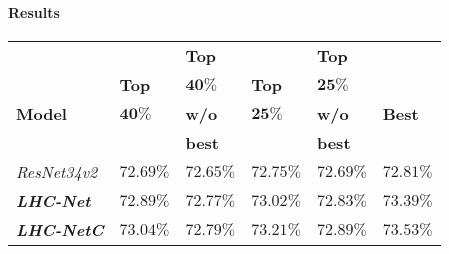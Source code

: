 \documentclass[fleqn,10pt]{SelfArx}
\begin{document}
\paragraph{Results}
\begin{center}
\begin{tabular}{||p{1.58cm} | p{0.85cm} | p{0.85cm} | p{0.85cm} | p{0.85cm} | p{0.85cm}||}  
 \hline
                      &                                                & \hspace{0.15cm}\textbf{Top}         &                                                    &\hspace{0.08cm} \textbf{Top}                             &  \\ 
                      &\hspace{0.1cm} \textbf{Top}        & \hspace{0.15cm}$\mathbf{40 \%}$ & \hspace{0.15cm}\textbf{Top}           &\hspace{0.08cm} $\mathbf{25 \%}$                    &\\
\hspace{0.35cm}\textbf{Model}                      &\hspace{0.1cm} $\mathbf{40 \%}$ & \hspace{0.15cm}\textbf{w/o}         & \hspace{0.15cm}$\mathbf{25 \%}$   &\hspace{0.08cm} \textbf{w/o}                            & \hspace{0.03cm} \textbf{Best}\\
                      &                                                & \hspace{0.15cm}\textbf{best}         &                                                    &\hspace{0.14cm}\textbf{best}                            &\\
 \hline
 \hline
\textit{ResNet34v2} & $72.69\%$ & $72.65\%$ & $72.75\%$ & $72.69\%$ & $72.81\%$\\
 \hline
 \hline
\textbf{\textit{LHC-Net}} & $\mathbf{72.89\%}$ & $72.77\%$ & $\mathbf{73.02\%}$ & $72.83\%$ & $\mathbf{73.39\%}$\\
 \hline
 \hline
\textbf{\textit{LHC-NetC}} & $\mathbf{73.04\%}$ & $72.79\%$ & $\mathbf{73.21\%}$ & $72.89\%$ & $\mathbf{73.53\%}$\\
 \hline
\end{tabular}
\end{center}
\end{document}
